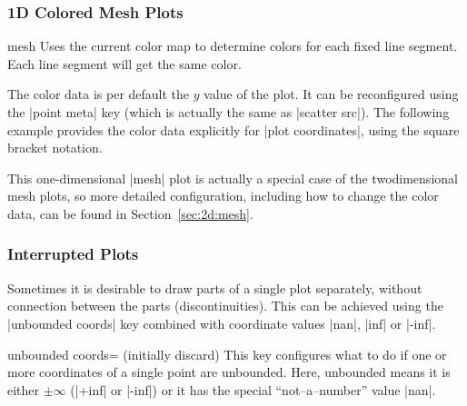 {\subsubsection{1D Colored Mesh Plots}
\label{sec:1d:mesh}
\begin{plottype}[/pgfplots]{mesh}
	Uses the current color map to determine colors for each fixed line segment. Each line segment will get the same color.
\begin{codeexample}[]
\end{codeexample}
	The color data is per default the $y$ value of the plot. It can be reconfigured using the |point meta| key (which is actually the same as |scatter src|). The following example provides the color data explicitly for |plot coordinates|, using the square bracket notation.
\begin{codeexample}[]
\end{codeexample}
	This one-dimensional |mesh| plot is actually a special case of the twodimensional mesh plots, so more detailed configuration, including how to change the color data, can be found in Section~\ref{sec:2d:mesh}.

\end{plottype}


\subsubsection{Interrupted Plots}
%
\label{pgfplots:interrupt}%
Sometimes it is desirable to draw parts of a single plot separately, without connection between the parts (discontinuities). This can be achieved using the |unbounded coords| key combined with coordinate values |nan|, |inf| or |-inf|.

\begin{pgfplotskey}{unbounded coords= (initially discard)}
	This key configures what to do if one or more coordinates of a single point are unbounded. Here, unbounded means it is either $\pm \infty$ (|+inf| or |-inf|) or it has the special ``not--a--number'' value |nan|.


\end{pgfplotskey}}
